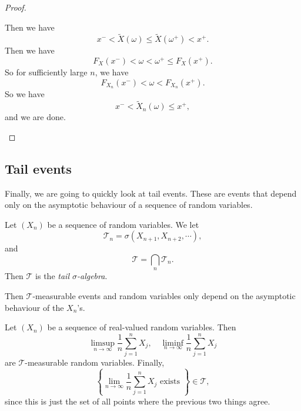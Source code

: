 \documentclass[a4paper]{article}
\begin{document}
\begin{proof}
\begin{enumerate}
\begin{center}
       \end{center}
       Then we have
       \[
         x^- < \tilde{X}(\omega) \leq \tilde{X}(\omega^+) < x^+.
       \]
       Then we have
       \[
         F_X(x^-) < \omega < \omega^+ \leq F_X(x^+).
       \]
       So for sufficiently large $n$, we have
       \[
         F_{X_n}(x^-) < \omega < F_{X_n}(x^+).
       \]
       So we have
       \[
         x^- < \tilde{X}_n(\omega) \leq x^+,
       \]
       and we are done.
  \end{enumerate}
\end{proof}

\subsection{Tail events}
Finally, we are going to quickly look at tail events. These are events that depend only on the asymptotic behaviour of a sequence of random variables.
\begin{defi}
  Let $(X_n)$ be a sequence of random variables. We let
  \[
    \mathcal{T}_n = \sigma(X_{n + 1}, X_{n + 2}, \cdots),
  \]
  and
  \[
    \mathcal{T} = \bigcap_n \mathcal{T}_n.
  \]
  Then $\mathcal{T}$ is the \emph{tail $\sigma$-algebra}.
\end{defi}
Then $\mathcal{T}$-measurable  events and random variables only depend on the asymptotic behaviour of the $X_n$'s.

\begin{eg}
  Let $(X_n)$ be a sequence of real-valued random variables. Then
  \[
    \limsup_{n \to \infty} \frac{1}{n} \sum_{j = 1}^n X_j,\quad \liminf_{n \to \infty} \frac{1}{n} \sum_{j = 1}^n X_j
  \]
  are $\mathcal{T}$-measurable random variables. Finally,
  \[
    \left\{\lim_{n \to \infty} \frac{1}{n} \sum_{j = 1}^n X_j\text{ exists }\right\} \in \mathcal{T},
  \]
  since this is just the set of all points where the previous two things agree.
\end{eg}
\end{document}
